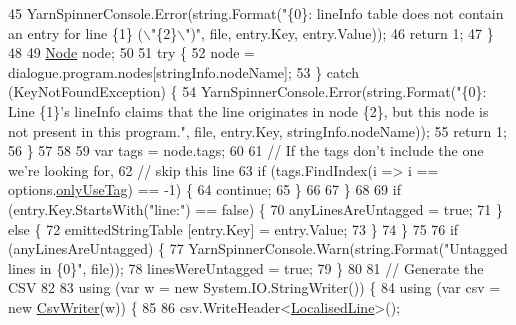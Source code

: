 \begin{DoxyCode}
45                             YarnSpinnerConsole.Error(string.Format(\textcolor{stringliteral}{"\{0\}: lineInfo table does not contain an
       entry for line \{1\} (\(\backslash\)"\{2\}\(\backslash\)")"}, file, entry.Key, entry.Value));
46                             \textcolor{keywordflow}{return} 1;
47                         \}
48 
49                         \hyperlink{a00041_a00361}{Node} node;
50 
51                         \textcolor{keywordflow}{try} \{
52                             node = dialogue.program.nodes[stringInfo.nodeName];
53                         \} \textcolor{keywordflow}{catch} (KeyNotFoundException) \{
54                             YarnSpinnerConsole.Error(string.Format(\textcolor{stringliteral}{"\{0\}: Line \{1\}'s lineInfo claims that
       the line originates in node \{2\}, but this node is not present in this program."}, file, entry.Key, 
      stringInfo.nodeName));
55                             \textcolor{keywordflow}{return} 1;
56                         \}
57 
58 
59                         var tags = node.tags;
60 
61                         \textcolor{comment}{// If the tags don't include the one we're looking for,}
62                         \textcolor{comment}{// skip this line}
63                         \textcolor{keywordflow}{if} (tags.FindIndex(i => i == options.\hyperlink{a00097_a8b30c1b7fb1b74eae455a568c1024b3d}{onlyUseTag}) == -1) \{
64                             \textcolor{keywordflow}{continue};
65                         \}
66 
67                     \}
68 
69                     \textcolor{keywordflow}{if} (entry.Key.StartsWith(\textcolor{stringliteral}{"line:"}) == \textcolor{keyword}{false}) \{
70                         anyLinesAreUntagged = \textcolor{keyword}{true};
71                     \} \textcolor{keywordflow}{else} \{
72                         emittedStringTable [entry.Key] = entry.Value;
73                     \}
74                 \}
75 
76                 \textcolor{keywordflow}{if} (anyLinesAreUntagged) \{
77                     YarnSpinnerConsole.Warn(string.Format(\textcolor{stringliteral}{"Untagged lines in \{0\}"}, file));
78                     linesWereUntagged = \textcolor{keyword}{true};
79                 \}
80 
81                 \textcolor{comment}{// Generate the CSV}
82 
83                 \textcolor{keyword}{using} (var w = \textcolor{keyword}{new} System.IO.StringWriter()) \{
84                     \textcolor{keyword}{using} (var csv = \textcolor{keyword}{new} \hyperlink{a00071}{CsvWriter}(w)) \{
85 
86                         csv.WriteHeader<\hyperlink{a00124}{LocalisedLine}>();

\end{DoxyCode}

